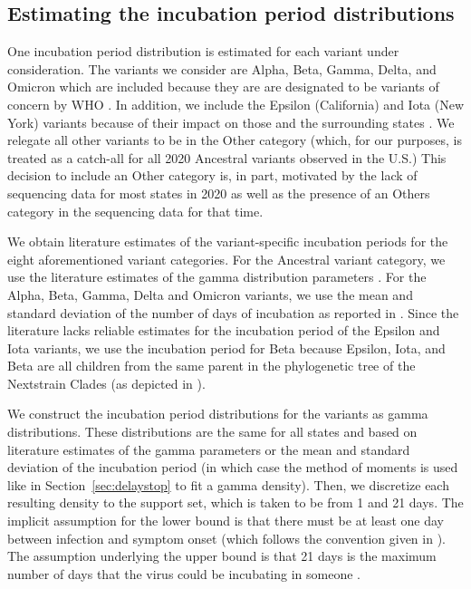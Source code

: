 \documentclass{article}
\begin{document}
\subsection{Estimating the incubation period distributions} 

One incubation period distribution is estimated for each variant under
consideration. The variants we consider are Alpha, Beta, Gamma, Delta, and Omicron which
are included because they are are designated to be variants of concern by WHO 
\citep{who2021tracking}. In addition, we
include the Epsilon (California) and Iota (New York) variants because of their
impact on those and the surrounding states \citep{yang2022investigation,
duerr2021dominance}. We relegate all other variants to be in the Other category
(which, for our purposes, is treated as a catch-all for all 2020 Ancestral
variants observed in the U.S.) This decision to include an Other category is, in
part, motivated by the lack of sequencing data for most states in 2020 as well
as the presence of an Others category in the sequencing data for that time. 

We obtain literature estimates of the variant-specific incubation periods for
the eight aforementioned variant categories. For the Ancestral variant category, we use the literature
estimates of the gamma distribution parameters \citep{tindale2020evidence}. For
the Alpha, Beta, Gamma, Delta and Omicron variants, we use the mean and standard
deviation of the number of days of incubation as reported in
\citet{tanaka2022shorter, grant2022impact, ogata2022shorter}.
Since the literature lacks reliable estimates for the incubation period of the
Epsilon and Iota variants, we use the incubation period for Beta because
Epsilon, Iota, and Beta are all children from the same parent in the
phylogenetic tree of the Nextstrain Clades (as depicted in
\citealp{hodcroft2021covariants}). 

We construct the incubation period distributions for the variants as gamma
distributions. These distributions are the same for all states and based on
literature estimates of the gamma parameters or the mean and standard deviation
of the incubation period (in which case the method of moments is used like in Section~\ref{sec:delaystop} to fit a
gamma density). Then, we discretize each resulting density to the support set,
which is taken to be from 1 and 21 days. The implicit assumption for the lower bound is that there
must be at least one day between infection and symptom onset (which follows the
convention given in \citealp{phcan2021covid}). The assumption underlying the
upper bound is that 21 days is the maximum number of days that the virus could
be incubating in someone \citep{zaki2021estimations, cortes2022sars}.
\end{document}
